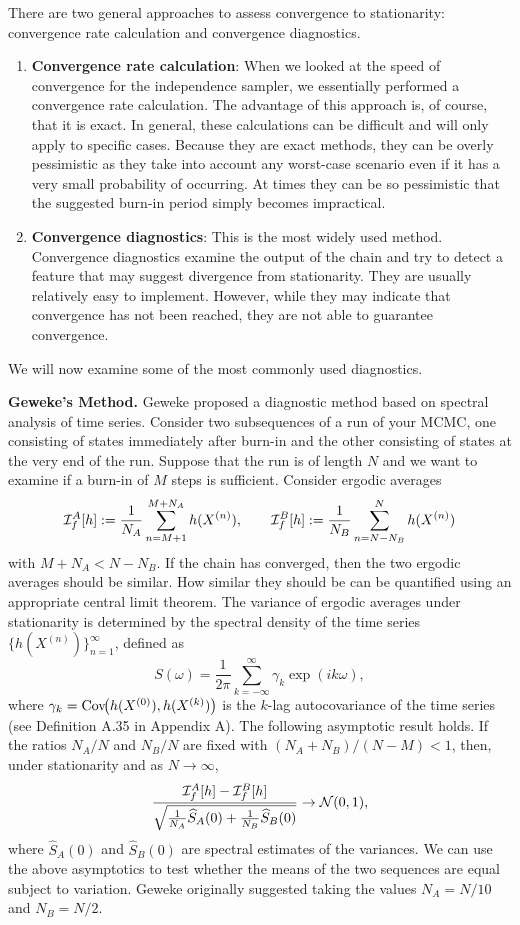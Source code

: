 There are two general approaches to assess convergence to stationarity: convergence rate
calculation and convergence diagnostics.
\begin{enumerate}
\item \textbf{Convergence rate calculation}: When we looked at the speed of convergence for the independence sampler, we essentially performed a convergence rate calculation. The advantage
of this approach is, of course, that it is exact. In general, these calculations can be difficult
and will only apply to specific cases. Because they are exact methods, they can be overly
pessimistic as they take into account any worst-case scenario even if it has a very small
probability of occurring. At times they can be so pessimistic that the suggested burn-in
period simply becomes impractical.

\item \textbf{Convergence diagnostics}: This is the most widely used method. Convergence diagnostics
examine the output of the chain and try to detect a feature that may suggest divergence
from stationarity. They are usually relatively easy to implement. However, while they may
indicate that convergence has not been reached, they are not able to guarantee convergence.
\end{enumerate}
We will now examine some of the most commonly used diagnostics.

\medskip
\noindent\textbf{Geweke's Method.}
Geweke proposed a diagnostic method based on spectral analysis of time
series. Consider two subsequences of a run of your MCMC, one consisting of states immediately
after burn-in and the other consisting of states at the very end of the run. Suppose that the run
is of length $N$ and we want to examine if a burn-in of $M$ steps is sufficient. Consider ergodic
averages
\[
  \mathcal{I}_f^A[h] := \frac{1}{N_A} \sum_{n=M+1}^{M+N_A} h(X^{(n)}),
  \qquad
  \mathcal{I}_f^B[h] := \frac{1}{N_B} \sum_{n=N-N_B}^{N} h(X^{(n)})
\]
with $M + N_A < N - N_B$. If the chain has converged, then the two ergodic averages should be
similar. How similar they should be can be quantified using an appropriate central limit theorem.
The variance of ergodic averages under stationarity is determined by the spectral density of the
time series $\{h(X^{(n)})\}_{n=1}^\infty$, defined as
\[
  S(\omega) = \frac{1}{2\pi} \sum_{k=-\infty}^{\infty} \gamma_k \exp(ik\omega),
\]
where $\gamma_k = \operatorname{Cov}\!\bigl(h(X^{(0)}), h(X^{(k)})\bigr)$ is the $k$-lag autocovariance of the time series (see Definition
A.35 in Appendix A). The following asymptotic result holds. If the ratios $N_A/N$ and $N_B/N$ are
fixed with $(N_A + N_B)/(N - M) < 1$, then, under stationarity and as $N \to \infty$,
\[
  \frac{\mathcal{I}_f^A[h] - \mathcal{I}_f^B[h]}{\sqrt{\frac{1}{N_A}\widehat{S}_A(0) + \frac{1}{N_B}\widehat{S}_B(0)}}
  \to \mathcal{N}(0, 1),
\]
where $\widehat{S}_A(0)$ and $\widehat{S}_B(0)$ are spectral estimates of the variances. We can use the above asymptotics to test whether the means of the two sequences are equal subject to variation. Geweke
originally suggested taking the values $N_A = N/10$ and $N_B = N/2$.

